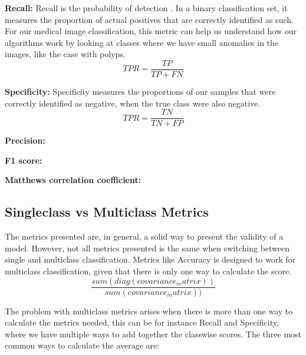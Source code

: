 \vspace{5px}
\textbf{Recall:}  Recall is the probability of detection . In a binary classification set, it measures the proportion of actual positives that are correctly identified as such. 
For our medical image classification, this metric can help us understand how our algorithms work by looking at classes where we have small anomalies in the images, like the case with polyps.
\begin{equation}
TPR=\frac{TP}{TP+FN}
\end{equation}

\vspace{5px}
\textbf{Specificity:} Specificity measures the proportions of our samples that were correctly identified as negative, when the true class were also negative. 
\begin{equation}
TPR=\frac{TN}{TN+FP}
\end{equation}

\vspace{5px}
\textbf{Precision:}



\vspace{5px}
\textbf{F1 score:}

\vspace{5px}
\textbf{Matthews correlation coefficient:}

\subsection{Singleclass vs Multiclass Metrics}

The metrics presented are, in general, a solid way to present the validity of a model. However, not all metrics presented is the same when switching between single and multiclass classification.  Metrics like Accuracy is designed to work for multiclass classification, given that there is only one way to calculate the score.
\begin{equation}
\frac{sum(diag(covariance_matrix))}{sum(covariance_matrix))}
\end{equation}

The problem with multiclass metrics arises when there is more than one way to calculate the metrics needed, this can be for instance Recall and Specificity, where we have multiple ways to add together the classwise scores. The three most common ways to calculate the average are:

